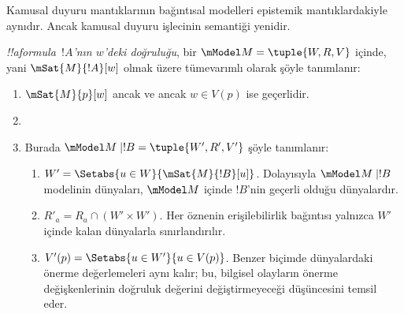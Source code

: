 \documentclass[../../../include/open-logic-section]{subfiles}
\begin{document}


Kamusal duyuru mantıklarının bağıntısal modelleri epistemik mantıklardakiyle
aynıdır. Ancak kamusal duyuru işlecinin semantiği yenidir.

\begin{defn} \emph{!!a{formula}~$!A$'nın $w$'deki
  doğruluğu}, bir $\mModel M = \tuple{W, R, V}$ içinde, yani
  $\mSat{M}{!A}[w]$ olmak üzere tümevarımlı olarak şöyle tanımlanır:
  \begin{enumerate}
  \item $\mSat{M}{p}[w]$ ancak ve ancak $w \in V(p)$ ise geçerlidir.
  \item{}
  \item{}

  
  Burada $\mModel M \mid !B = \tuple{W', R', V'}$ şöyle tanımlanır:
  \begin{enumerate}
    \item $W' = \Setabs{ u \in W}{\mSat{M}{!B}[u]}$. Dolayısıyla
      $\mModel M \mid !B$ modelinin dünyaları, $\mModel M$ içinde $!B$'nin
      geçerli olduğu dünyalardır.
    \item $R'_a = R_a \cap (W' \times W')$. Her öznenin erişilebilirlik
      bağıntısı yalnızca $W'$ içinde kalan dünyalarla sınırlandırılır.
    \item $V'(p) = \Setabs{ u \in W'}{u \in V(p) }$. Benzer biçimde
      dünyalardaki önerme değerlemeleri aynı kalır; bu, bilgisel olayların
      önerme değişkenlerinin doğruluk değerini değiştirmeyeceği düşüncesini
      temsil eder.
  \end{enumerate}
  
  \end{enumerate} 
\end{defn}
\end{document}
